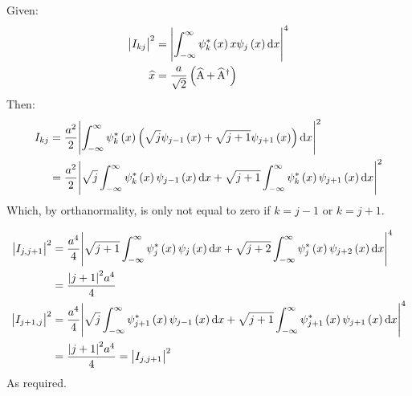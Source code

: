 \subsection{}
Given:
\begin{align*}
    \abs{I_{kj}}^2 & = \abs{\int_{-\infty}^{\infty} \psi_k^* \del{x} x \psi_j \del{x} \dif x}^4\\
    \widehat{x} & = \frac{a}{\sqrt{2}} \del{\loweringoperator + \raisingoperator}
\end{align*}
Then:
\begin{align*}
    I_{kj} & = \frac{a^2}{2} \abs{\int_{-\infty}^{\infty} \psi_k^* \del{x} \del{\sqrt{j} \psi_{j-1} \del{x} + \sqrt{j+1} \psi_{j+1} \del{x}} \dif x}^2\\
    & = \frac{a^2}{2} \abs{\sqrt{j} \int_{-\infty}^{\infty} \psi_k^* \del{x} \psi_{j-1} \del{x} \dif x + \sqrt{j+1} \int_{-\infty}^{\infty} \psi_k^* \del{x} \psi_{j+1} \del{x} \dif x}^2
\end{align*}
Which, by orthanormality, is only not equal to zero if $ k = j - 1 $ or $ k = j + 1 $.

\begin{align*}
    \abs{I_{j, j+1}}^2 & = \frac{a^4}{4} \abs{\sqrt{j+1} \int_{-\infty}^{\infty} \psi_j^* \del{x} \psi_j \del{x} \dif x + \sqrt{j+2} \int_{-\infty}^{\infty} \psi_j^* \del{x} \psi_{j+2} \del{x} \dif x}^4\\
    & = \frac{\abs{j + 1}^2 a^4}{4}\\
    \abs{I_{j+1,j}}^2 & = \frac{a^4}{4} \abs{\sqrt{j} \int_{-\infty}^{\infty} \psi_{j+1}^* \del{x} \psi_{j-1} \del{x} \dif x + \sqrt{j+1} \int_{-\infty}^{\infty} \psi_{j+1}^* \del{x} \psi_{j+1} \del{x} \dif x}^4\\
    & = \frac{\abs{j + 1}^2 a^4}{4} = \abs{I_{j, j+1}}^2
\end{align*}
As required.
